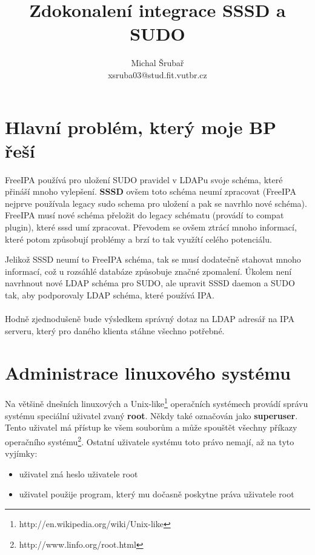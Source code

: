 \documentclass[12pt,a4paper,titlepage,final]{article}
\begin{document}
\author{Michal Šrubař\\xsruba03@stud.fit.vutbr.cz}
\date{}	
\title{Zdokonalení integrace SSSD a SUDO}
\maketitle
%

\pagestyle{plain}
\setcounter{page}{1}
\tableofcontents

\newpage
\pagestyle{plain}
\setcounter{page}{1}

\section*{Hlavní problém, který moje BP řeší}
FreeIPA používá pro uložení SUDO pravidel v LDAPu svoje schéma, které přináší
mnoho vylepšení. \textbf{SSSD} ovšem toto schéma neumí zpracovat (FreeIPA
nejprve používala legacy sudo schema pro uložení a pak se navrhlo nové schéma).
FreeIPA musí nové schéma přeložit do legacy schématu (provádí to compat plugin),
které sssd umí zpracovat. Převodem se ovšem ztrácí mnoho informací, které potom
způsobují problémy a brzí to tak využítí celého potenciálu.

Jelikož SSSD neumí to FreeIPA schéma, tak se musí dodatečně stahovat mnoho
informací, což u rozsáhlé databáze způsobuje značné zpomalení. Úkolem není
navrhnout nové LDAP schéma pro SUDO, ale upravit SSSD daemon a SUDO tak, aby
podporovaly LDAP schéma, které používá IPA.
\\
\\
Hodně zjednodušeně bude výsledkem správný dotaz na LDAP adresář na IPA serveru,
který pro daného klienta stáhne všechno potřebné.


\section{Administrace linuxového systému}
Na většině dnešních linuxových a
Unix-like\footnote{http://en.wikipedia.org/wiki/Unix-like} operačních systémech
provádí správu systému speciální uživatel zvaný \textbf{root}. Někdy také
označován jako \textbf{superuser}. Tento uživatel má přístup ke všem souborům a
může spouštět všechny příkazy operačního
systému\footnote{http://www.linfo.org/root.html}.  Ostatní uživatele systému
toto právo nemají, až na tyto vyjímky: \begin{itemize}
	\item uživatel zná heslo uživatele root
	\item uživatel použije program, který mu dočasně poskytne práva uživatele root
\end{itemize}
\end{document}
